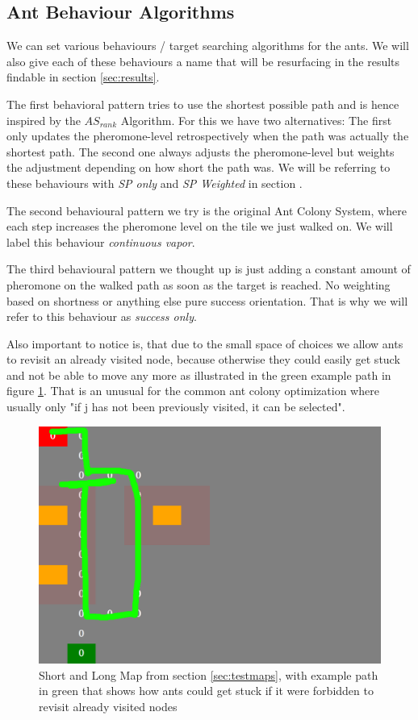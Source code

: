 \subsection{Ant Behaviour Algorithms}
\label{sec:behaviour}
We can set various behaviours / target searching algorithms for the ants. We will also give each of these behaviours a name that will be resurfacing in the results findable in section \ref{sec:results}.

The first behavioral pattern tries to use the shortest possible path and is hence inspired by the $AS_{rank}$ Algorithm\cite{zecchin2007ant}.
For this we have two alternatives: The first only updates the pheromone-level retrospectively when the path was actually the shortest path. The second one always adjusts the pheromone-level but weights the adjustment depending on how short the path was.
We will be referring to these behaviours with \textit{SP only} and \textit{SP Weighted} in section .

The second behavioural pattern we try is the original Ant Colony System\cite{maniezzo2002ant}, where each step increases the pheromone level on the tile we just walked on. We will label this behaviour \textit{continuous vapor}.

The third behavioural pattern we thought up is just adding a constant amount of pheromone on the walked path as soon as the target is reached. No weighting based on shortness or anything else pure success orientation. That is why we will refer to this behaviour as \textit{success only}.

Also important to notice is, that due to the small space of choices we allow ants to revisit an already visited node, because otherwise they could easily get stuck  and not be able to move any more as illustrated in the green example path in figure \ref{fig:gettingstuck}. That is an unusual for the common ant colony optimization where usually only "if j has  not  been  previously  visited,  it  can  be  selected"\cite{dorigo2006ant}.

\begin{figure}[H]
  \centering
  \includegraphics[width=1\linewidth]{images/map_shortlong_deadend}
  \caption{Short and Long Map from section \ref{sec:testmaps}, with example path in green that shows how ants could get stuck if it were forbidden to revisit already visited nodes}
  \label{fig:gettingstuck}
\end{figure}


